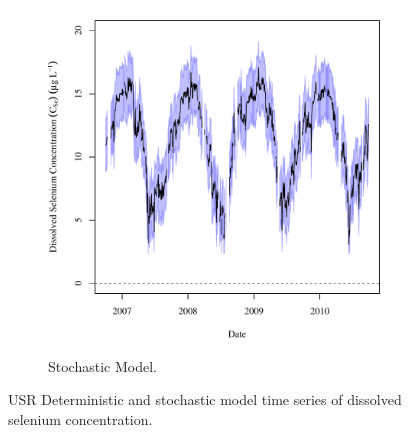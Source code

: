 \begin{linenumbers}
\begin{landscape}
\begin{figure}
\begin{subfigure}{0.7\textwidth}
			\includegraphics[width=\tableCustomSize]{"Figures/Results_USR/Stochastic/c TS CON"}
			\caption{Stochastic Model.}
		\end{subfigure}
		\caption{USR Deterministic and stochastic model time series of dissolved selenium concentration.}
	\end{figure}
\end{landscape}


\end{linenumbers}
